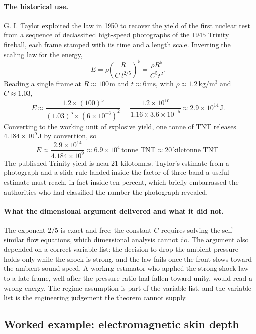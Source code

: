 \paragraph{The historical use.} G. I. Taylor exploited the law in
1950 to recover the yield of the first nuclear test from a sequence
of declassified high-speed photographs of the 1945 Trinity fireball,
each frame stamped with its time and a length scale. Inverting the
scaling law for the energy,
\[
E = \rho \left(\frac{R}{C\, t^{2/5}}\right)^{5}
  = \frac{\rho R^{5}}{C^{5} t^{2}}.
\]
Reading a single frame at $R \approx 100 \,\si{\meter}$ and
$t \approx 6 \,\si{\milli\second}$, with $\rho \approx 1.2 \,\si
{\kilogram\per\meter\cubed}$ and $C \approx 1.03$,
\[
E \approx \frac{1.2 \times (100)^{5}}{(1.03)^{5} \times (6 \times
10^{-3})^{2}}
= \frac{1.2 \times 10^{10}}{1.16 \times 3.6 \times 10^{-5}}
\approx 2.9 \times 10^{14} \,\si{\joule}.
\]
Converting to the working unit of explosive yield, one tonne of TNT
releases $4.184 \times 10^{9} \,\si{\joule}$ by convention, so
\[
E \approx \frac{2.9 \times 10^{14}}{4.184 \times 10^{9}}
\approx 6.9 \times 10^{4} \,\text{tonne TNT}
\approx 20 \,\text{kilotonne TNT}.
\]
The published Trinity yield is near $21$ kilotonnes. Taylor's estimate
from a photograph and a slide rule landed inside the factor-of-three
band a useful estimate must reach, in fact inside ten percent, which
briefly embarrassed the authorities who had classified the number the
photograph revealed.

\paragraph{What the dimensional argument delivered and what it did
not.} The exponent $2/5$ is exact and free; the constant $C$ requires
solving the self-similar flow equations, which dimensional analysis
cannot do. The argument also depended on a correct variable list: the
decision to drop the ambient pressure holds only while the shock is
strong, and the law fails once the front slows toward the ambient
sound speed. A working estimator who applied the strong-shock law to
a late frame, well after the pressure ratio had fallen toward unity,
would read a wrong energy. The regime assumption is part of the
variable list, and the variable list is the engineering judgement the
theorem cannot supply.



\subsection{Worked example: electromagnetic skin depth}

